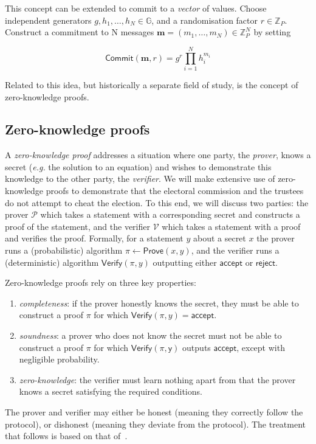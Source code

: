 \documentclass[12pt,a4paper]{article}
\newcommand{\commit}{\mathsf{Commit}}
\theoremstyle{definition}
\newcommand{\eg}{\textit{e.g. }}
\begin{document}
This concept can be extended to commit to a \textit{vector} of values. Choose independent generators $g, h_1, \ldots, h_N\in\mathbb{G}$, and a randomisation factor $r\in\mathbb{Z}_P$. Construct a commitment to N messages $\mathbf{m}=(m_1,\ldots,m_N)\in\mathbb{Z}_P^N$ by setting

$$\commit(\mathbf{m}, r)=g^r\prod_{i=1}^N h_i^{m_i}$$

Related to this idea, but historically a separate field of study, is the concept of zero-knowledge proofs.

\subsection{Zero-knowledge proofs}
A \textit{zero-knowledge proof} addresses a situation where one party, the \textit{prover}, knows a secret (\eg the solution to an equation) and wishes to demonstrate this knowledge to the other party, the \textit{verifier}. We will make extensive use of zero-knowledge proofs to demonstrate that the electoral commission and the trustees do not attempt to cheat the election. To this end, we will discuss two parties: the prover $\mathcal{P}$ which takes a statement with a corresponding secret and constructs a proof of the statement, and the verifier $\mathcal{V}$ which takes a statement with a proof and verifies the proof. Formally, for a statement $y$ about a secret $x$ the prover runs a (probabilistic) algorithm $\pi \gets \mathsf{Prove}(x, y)$, and the verifier runs a (deterministic) algorithm $\mathsf{Verify}(\pi, y)$ outputting either $\mathsf{accept}$ or $\mathsf{reject}$.

Zero-knowledge proofs rely on three key properties:
\begin{enumerate}
    \item \textit{completeness}: if the prover honestly knows the secret, they must be able to construct a proof $\pi$ for which $\mathsf{Verify}(\pi, y) = \mathsf{accept}$.
    \item \textit{soundness}: a prover who does not know the secret must not be able to construct a proof $\pi$ for which $\mathsf{Verify(\pi, y)}$ outputs $\mathsf{accept}$, except with negligible probability.
    \item \textit{zero-knowledge}: the verifier must learn nothing apart from that the prover knows a secret satisfying the required conditions.
\end{enumerate}
The prover and verifier may either be honest (meaning they correctly follow the protocol), or dishonest (meaning they deviate from the protocol). The treatment that follows is based on that of~\cite{boneh2020graduate}.
\end{document}
